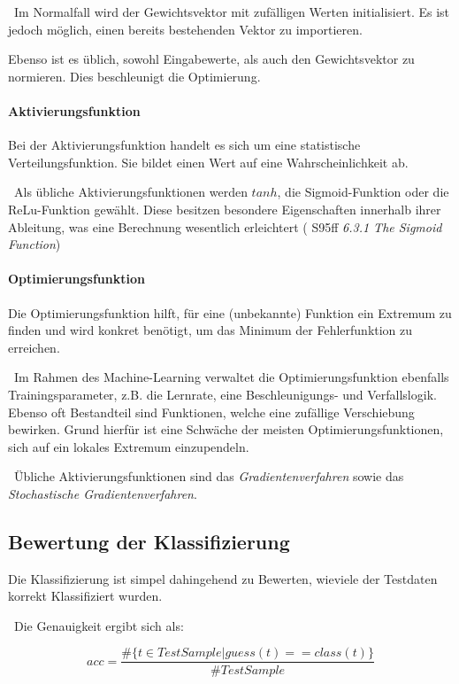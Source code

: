 ~\newline Im Normalfall wird der Gewichtsvektor mit zufälligen Werten initialisiert. Es ist jedoch möglich, einen bereits bestehenden Vektor zu importieren. 

Ebenso ist es üblich, sowohl Eingabewerte, als auch den Gewichtsvektor zu normieren. Dies beschleunigt die Optimierung. 
\paragraph{Aktivierungsfunktion}
Bei der Aktivierungsfunktion handelt es sich um eine statistische Verteilungsfunktion. Sie bildet einen Wert auf eine Wahrscheinlichkeit ab. 

~\newline Als übliche Aktivierungsfunktionen werden $tanh$, die Sigmoid-Funktion oder die ReLu-Funktion gewählt. Diese besitzen besondere Eigenschaften innerhalb ihrer Ableitung, was eine Berechnung wesentlich erleichtert (\cite{stroetmann} S95ff \textit{6.3.1 The Sigmoid Function}) 

\paragraph{Optimierungsfunktion}
Die Optimierungsfunktion hilft, für eine (unbekannte) Funktion ein Extremum zu finden und wird konkret benötigt, um das Minimum der Fehlerfunktion zu erreichen.  

~\newline Im Rahmen des Machine-Learning verwaltet die Optimierungsfunktion ebenfalls Trainingsparameter, z.B. die Lernrate, eine Beschleunigungs- und Verfallslogik. Ebenso oft Bestandteil sind Funktionen, welche eine zufällige Verschiebung bewirken. Grund hierfür ist eine Schwäche der meisten Optimierungsfunktionen, sich auf ein lokales Extremum einzupendeln.

~\newline Übliche Aktivierungsfunktionen sind das \textit{Gradientenverfahren} sowie das \textit{Stochastische Gradientenverfahren}. 
\subsection{Bewertung der Klassifizierung}
Die Klassifizierung ist simpel dahingehend zu Bewerten, wieviele der Testdaten korrekt Klassifiziert wurden. 

~\newline Die Genauigkeit ergibt sich als: 

\begin{equation}
	acc = \dfrac{\#\{t \in  TestSample | guess(t)==class(t)\}}{\#TestSample}
\end{equation}